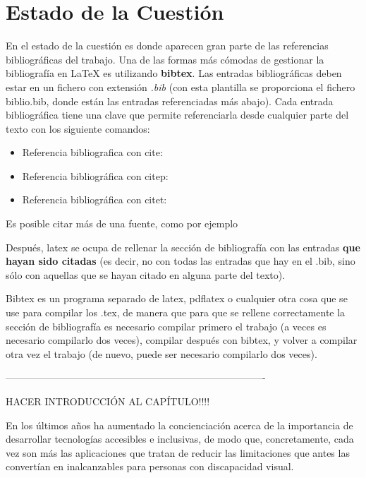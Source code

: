 \chapter{Estado de la Cuestión}
\label{cap:estadoDeLaCuestion}

En el estado de la cuestión es donde aparecen gran parte de las referencias bibliográficas del trabajo. Una de las formas más cómodas de gestionar la bibliografía en {\LaTeX} es utilizando \textbf{bibtex}. Las entradas bibliográficas deben estar en un fichero con extensión \textit{.bib} (con esta plantilla se proporciona el fichero biblio.bib, donde están las entradas referenciadas más abajo). Cada entrada bibliográfica tiene una clave que permite referenciarla desde cualquier parte del texto con los siguiente comandos:

\begin{itemize}
\item Referencia bibliografica con cite: \cite{ldesc2e}
\item Referencia bibliográfica con citep: \citep{notsoshort}
\item Referencia bibliográfica con citet: \citet{latexAPrimer}
\end{itemize}

Es posible citar más de una fuente, como por ejemplo \citep{latexCompanion,LaTeXLamport,texKnuth}

Después, latex se ocupa de rellenar la sección de bibliografía con las entradas \textbf{que hayan sido citadas} (es decir, no con todas las entradas que hay en el .bib, sino sólo con aquellas que se hayan citado en alguna parte del texto).

Bibtex es un programa separado de latex, pdflatex o cualquier otra cosa que se use para compilar los .tex, de manera que para que se rellene correctamente la sección de bibliografía es necesario compilar primero el trabajo (a veces es necesario compilarlo dos veces), compilar después con bibtex, y volver a compilar otra vez el trabajo (de nuevo, puede ser necesario compilarlo dos veces). 

-------------------------------------------------------------------------------

HACER INTRODUCCIÓN AL CAPÍTULO!!!!

En los últimos años ha aumentado la concienciación acerca de la importancia de desarrollar tecnologías accesibles e inclusivas, de modo que, concretamente, cada vez son más las aplicaciones que tratan de reducir las limitaciones que antes las convertían en inalcanzables para personas con discapacidad visual.

